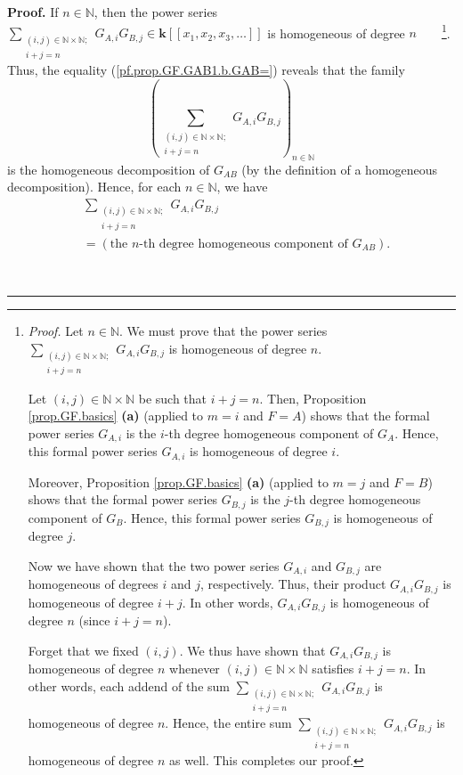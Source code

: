 \documentclass[numbers=enddot,12pt,final,onecolumn,notitlepage]{scrartcl}%
\theoremstyle{definition}
\newenvironment{proof}[1][Proof]{\noindent\textbf{#1.} }{\ \rule{0.5em}{0.5em}}
\let\sumnonlimits\sum
\renewcommand{\sum}{\sumnonlimits\limits}
\newenvironment{verlong}{}{}
\begin{document}
\begin{verlong}
\begin{proof}
If $n\in\mathbb{N}$, then the power series $\sum_{\substack{\left(
i,j\right)  \in\mathbb{N}\times\mathbb{N};\\i+j=n}}G_{A,i}G_{B,j}\in
\mathbf{k}\left[  \left[  x_{1},x_{2},x_{3},\ldots\right]  \right]  $ is
homogeneous of degree $n$\ \ \ \ \footnote{\textit{Proof.} Let $n\in
\mathbb{N}$. We must prove that the power series $\sum_{\substack{\left(
i,j\right)  \in\mathbb{N}\times\mathbb{N};\\i+j=n}}G_{A,i}G_{B,j}$ is
homogeneous of degree $n$.
\par
Let $\left(  i,j\right)  \in\mathbb{N}\times\mathbb{N}$ be such that $i+j=n$.
Then, Proposition \ref{prop.GF.basics} \textbf{(a)} (applied to $m=i$ and
$F=A$) shows that the formal power series $G_{A,i}$ is the $i$-th degree
homogeneous component of $G_{A}$. Hence, this formal power series $G_{A,i}$ is
homogeneous of degree $i$.
\par
Moreover, Proposition \ref{prop.GF.basics} \textbf{(a)} (applied to $m=j$ and
$F=B$) shows that the formal power series $G_{B,j}$ is the $j$-th degree
homogeneous component of $G_{B}$. Hence, this formal power series $G_{B,j}$ is
homogeneous of degree $j$.
\par
Now we have shown that the two power series $G_{A,i}$ and $G_{B,j}$ are
homogeneous of degrees $i$ and $j$, respectively. Thus, their product
$G_{A,i}G_{B,j}$ is homogeneous of degree $i+j$. In other words,
$G_{A,i}G_{B,j}$ is homogeneous of degree $n$ (since $i+j=n$).
\par
Forget that we fixed $\left(  i,j\right)  $. We thus have shown that
$G_{A,i}G_{B,j}$ is homogeneous of degree $n$ whenever $\left(  i,j\right)
\in\mathbb{N}\times\mathbb{N}$ satisfies $i+j=n$. In other words, each addend
of the sum $\sum_{\substack{\left(  i,j\right)  \in\mathbb{N}\times
\mathbb{N};\\i+j=n}}G_{A,i}G_{B,j}$ is homogeneous of degree $n$. Hence, the
entire sum $\sum_{\substack{\left(  i,j\right)  \in\mathbb{N}\times
\mathbb{N};\\i+j=n}}G_{A,i}G_{B,j}$ is homogeneous of degree $n$ as well. This
completes our proof.}. Thus, the equality (\ref{pf.prop.GF.GAB1.b.GAB=})
reveals that the family
\[
\left(  \sum_{\substack{\left(  i,j\right)  \in\mathbb{N}\times\mathbb{N}%
;\\i+j=n}}G_{A,i}G_{B,j}\right)  _{n\in\mathbb{N}}%
\]
is the homogeneous decomposition of $G_{AB}$ (by the definition of a
homogeneous decomposition). Hence, for each $n\in\mathbb{N}$, we have%
\begin{align}
&  \sum_{\substack{\left(  i,j\right)  \in\mathbb{N}\times\mathbb{N}%
;\\i+j=n}}G_{A,i}G_{B,j}\nonumber\\
&  =\left(  \text{the }n\text{-th degree homogeneous component of }%
G_{AB}\right)  . \label{pf.prop.GF.GAB1.b.hgc1}%
\end{align}



\end{proof}
\end{verlong}
\end{document}
